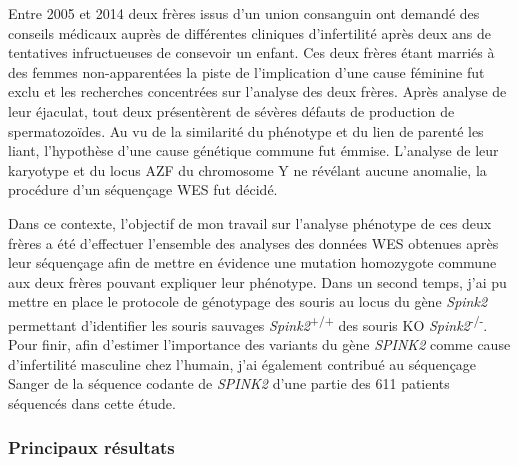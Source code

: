 \documentclass[12pt,twoside]{ugathesis}
\begin{document}
Entre 2005 et 2014 deux frères issus d'un union consanguin ont demandé
des conseils médicaux auprès de différentes cliniques d'infertilité
après deux ans de tentatives infructueuses de consevoir un enfant. Ces
deux frères étant marriés à des femmes non-apparentées la piste de
l'implication d'une cause féminine fut exclu et les recherches
concentrées sur l'analyse des deux frères. Après analyse de leur
éjaculat, tout deux présentèrent de sévères défauts de production de
spermatozoïdes. Au vu de la similarité du phénotype et du lien de
parenté les liant, l'hypothèse d'une cause génétique commune fut émmise.
L'analyse de leur karyotype et du locus AZF du chromosome Y ne révélant
aucune anomalie, la procédure d'un séquençage WES fut décidé.

Dans ce contexte, l'objectif de mon travail sur l'analyse phénotype de
ces deux frères a été d'effectuer l'ensemble des analyses des données
WES obtenues après leur séquençage afin de mettre en évidence une
mutation homozygote commune aux deux frères pouvant expliquer leur
phénotype. Dans un second temps, j'ai pu mettre en place le protocole de
génotypage des souris au locus du gène \emph{Spink2} permettant
d'identifier les souris sauvages \emph{Spink2}\textsuperscript{+/+} des
souris KO \emph{Spink2}\textsuperscript{-/-}. Pour finir, afin d'estimer
l'importance des variants du gène \emph{SPINK2} comme cause
d'infertilité masculine chez l'humain, j'ai également contribué au
séquençage Sanger de la séquence codante de \emph{SPINK2} d'une partie
des 611 patients séquencés dans cette étude.

\newpage



\newpage

\subsubsection{Principaux résultats}\label{principaux-resultats}
\end{document}
